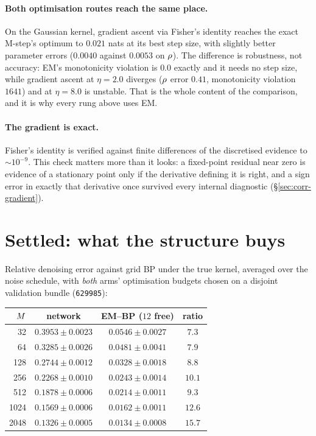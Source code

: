 \paragraph{Both optimisation routes reach the same place.} On the Gaussian kernel, gradient
ascent via Fisher's identity reaches the exact M-step's optimum to $0.021$ nats at its best step
size, with slightly better parameter errors ($0.0040$ against $0.0053$ on $\rho$). The
difference is robustness, not accuracy: EM's monotonicity violation is $0.0$ exactly and it needs
no step size, while gradient ascent at $\eta=2.0$ diverges ($\rho$ error $0.41$, monotonicity
violation $1641$) and at $\eta=8.0$ is unstable. That is the whole content of the comparison, and
it is why every rung above uses EM.

\paragraph{The gradient is exact.} Fisher's identity is verified against finite differences of
the discretised evidence to ${\sim}10^{-9}$. This check matters more than it looks: a fixed-point
residual near zero is evidence of a stationary point only if the derivative defining it is right,
and a sign error in exactly that derivative once survived every internal diagnostic
(\S\ref{sec:corr-gradient}).

\section{Settled: what the structure buys}
\label{sec:rec-efficiency}

Relative denoising error against grid BP under the true kernel, averaged over the noise schedule,
with \emph{both} arms' optimisation budgets chosen on a disjoint validation bundle
(\texttt{629985}):

\begin{center}\small
\begin{tabular}{@{}rccc@{}}
\toprule
$M$ & network & EM--BP ($12$ free) & ratio \\
\midrule
32   & $0.3953 \pm 0.0023$ & $\mathbf{0.0546 \pm 0.0027}$ & $7.3$ \\
64   & $0.3285 \pm 0.0026$ & $\mathbf{0.0481 \pm 0.0041}$ & $7.9$ \\
128  & $0.2744 \pm 0.0012$ & $\mathbf{0.0328 \pm 0.0018}$ & $8.8$ \\
256  & $0.2268 \pm 0.0010$ & $\mathbf{0.0243 \pm 0.0014}$ & $10.1$ \\
512  & $0.1878 \pm 0.0006$ & $\mathbf{0.0214 \pm 0.0011}$ & $9.3$ \\
1024 & $0.1569 \pm 0.0006$ & $\mathbf{0.0162 \pm 0.0011}$ & $12.6$ \\
2048 & $0.1326 \pm 0.0005$ & $\mathbf{0.0134 \pm 0.0008}$ & $15.7$ \\
\bottomrule
\end{tabular}
\end{center}

